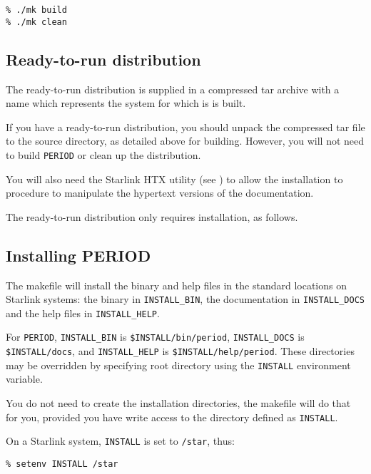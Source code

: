 \begin{myquote} 
\begin{verbatim} 
% ./mk build 
% ./mk clean 
\end{verbatim} 
\end{myquote}

\subsection{Ready-to-run distribution}

The ready-to-run distribution is supplied in a compressed tar archive
with a name which represents the system for which is is built.

If you have a ready-to-run distribution, you should unpack the
compressed tar file to the source directory, as detailed above for
building.  However, you will not need to build {\tt PERIOD} or clean up
the distribution.

You will also need the Starlink HTX utility (see
) to allow the installation to procedure to
manipulate the hypertext versions of the documentation.

The ready-to-run distribution only requires installation, as follows.

\subsection{Installing PERIOD}

The makefile will install the binary and help files in the standard
locations on Starlink systems:  the binary in {\tt INSTALL\_BIN}, the 
documentation in {\tt INSTALL\_DOCS} and the help files in 
{\tt INSTALL\_HELP}.  

For {\tt PERIOD}, {\tt INSTALL\_BIN} is {\tt \$INSTALL/bin/period},
{\tt INSTALL\_DOCS} is {\tt \$INSTALL/docs}, and
{\tt INSTALL\_HELP} is {\tt \$INSTALL/help/period}.  These
directories may be overridden by specifying root directory using the
{\tt INSTALL} environment variable.

You do not need to create the installation directories, the makefile will
do that for you, provided you have write access to the directory defined
as {\tt INSTALL}.

On a Starlink system, {\tt INSTALL} is set to {\tt /star}, thus:

\begin{myquote}
\begin{verbatim}
% setenv INSTALL /star
\end{verbatim}
\end{myquote}

